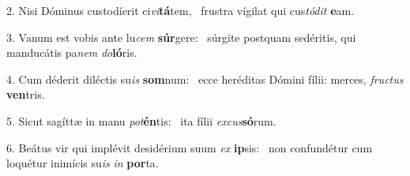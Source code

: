 2. Nisi Dóminus custodíerit ci\textit{vi}\textbf{tá}tem, \ast\  frustra vígilat qui cus\textit{tó}\textit{dit} \textbf{e}am.\

3. Vanum est vobis ante lu\textit{cem} \textbf{súr}gere: \ast\  súrgite postquam sedéritis, qui manducátis pa\textit{nem} \textit{do}\textbf{ló}ris.\

4. Cum déderit diléctis su\textit{is} \textbf{som}num: \ast\  ecce heréditas Dómini fílii: merces, \textit{fruc}\textit{tus} \textbf{ven}tris.\

5. Sicut sagíttæ in manu \textit{pot}\textbf{én}tis: \ast\  ita fílii \textit{ex}\textit{cus}\textbf{só}rum.\

6. Beátus vir qui implévit desidérium suum \textit{ex} \textbf{ip}sis: \ast\  non confundétur cum loquétur inimícis su\textit{is} \textit{in} \textbf{por}ta.\

